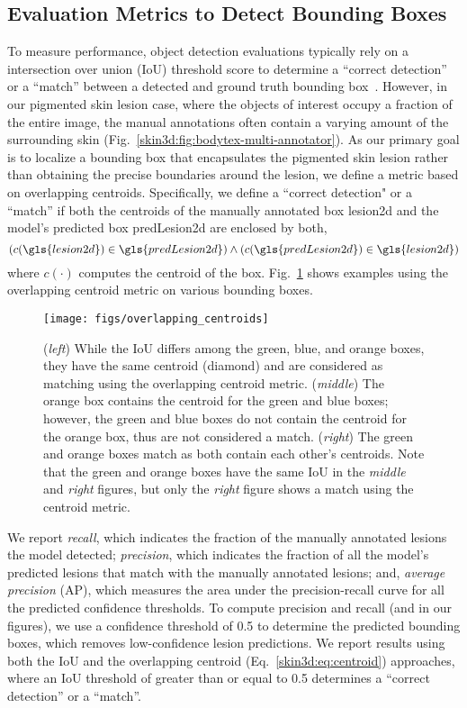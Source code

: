 \documentclass[journal]{IEEEtran}
\begin{document}
\subsection{Evaluation Metrics to Detect Bounding Boxes}
To measure performance, object detection evaluations typically rely on a intersection over union (IoU) threshold score to determine a ``correct detection'' or a ``match'' between a detected and ground truth bounding box~\citep{Padilla2020}. However, in our pigmented skin lesion case, where the objects of interest occupy a fraction of the entire image, the manual annotations often contain a varying amount of the surrounding skin (Fig.~\ref{skin3d:fig:bodytex-multi-annotator}). As our primary goal is to localize a bounding box that encapsulates the pigmented skin lesion rather than obtaining the precise boundaries around the lesion, we define a metric based on overlapping centroids. Specifically, we define a ``correct detection" or a ``match'' if both the centroids of the manually annotated box \gls{lesion2d} and the model's predicted box \gls{predLesion2d} are enclosed by both,
\begin{equation}
    \left( c(\gls{lesion2d}) \in \gls{predLesion2d} \right) \land \left( c(\gls{predLesion2d}) \in \gls{lesion2d} \right)
    \label{skin3d:eq:centroid}
\end{equation}
where $c(\cdot)$ computes the centroid of the box. Fig.~\ref{skin3d:fig:centroids} shows examples using the overlapping centroid metric on various bounding boxes.

\begin{figure}[htb]
\centering
\texttt{[image: figs/overlapping\_centroids]}
\caption{(\emph{left}) While the IoU differs among the green, blue, and orange boxes, they have the same centroid (diamond) and are considered as matching using the overlapping centroid metric. (\emph{middle}) The orange box contains the centroid for the green and blue boxes; however, the green and blue boxes do not contain the centroid for the orange box, thus are not considered a match. (\emph{right}) The green and orange boxes match as both contain each other's centroids. Note that the green and orange boxes have the same IoU in the \emph{middle} and \emph{right} figures, but only the \emph{right} figure shows a match using the centroid metric.}
\label{skin3d:fig:centroids}
\end{figure}

We report \emph{recall}, which indicates the fraction of the manually annotated lesions the model detected; \emph{precision}, which indicates the fraction of all the model's predicted lesions that match with the manually annotated lesions; and, \emph{average precision} (AP), which measures the area under the precision-recall curve for all the predicted confidence thresholds. To compute precision and recall (and in our figures), we use a confidence threshold of 0.5 to determine the predicted bounding boxes, which removes low-confidence lesion predictions. We report results using both the IoU and the overlapping centroid (Eq.~\ref{skin3d:eq:centroid}) approaches, where an IoU threshold of greater than or equal to 0.5 determines a ``correct detection'' or a ``match''.
\end{document}
